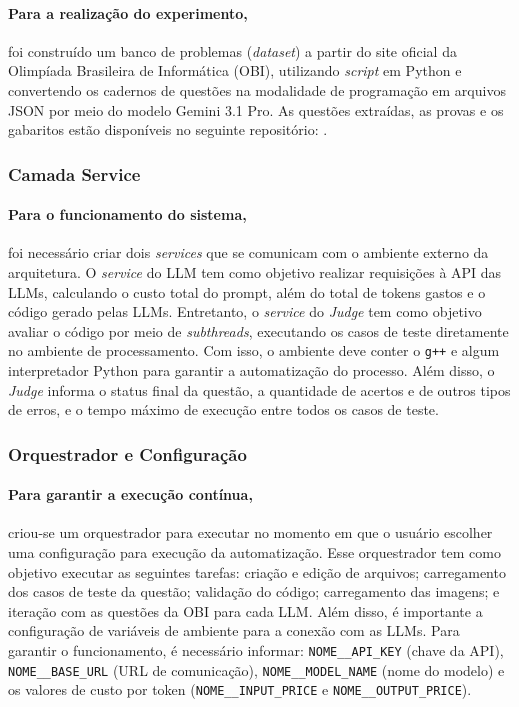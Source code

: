 \documentclass[sigconf]{acmart}
\begin{document}
\paragraph{Para a realização do experimento,}
foi construído um banco de problemas (\textit{dataset}) a partir do site oficial da Olimpíada Brasileira de Informática (OBI), utilizando \textit{script} em Python e convertendo os cadernos de questões na modalidade de programação em arquivos JSON por meio do modelo Gemini 3.1 Pro. As questões extraídas, as provas e os gabaritos estão disponíveis no seguinte repositório: \cite{gema2026problems}.

\subsubsection{Camada Service}
\label{sec:Camada de Service}
\paragraph{Para o funcionamento do sistema,} foi necessário criar dois \textit{services} que se comunicam com o ambiente externo da arquitetura. O \textit{service} do LLM tem como objetivo realizar requisições à API das LLMs, calculando o custo total do prompt, além do total de tokens gastos e o código gerado pelas LLMs. Entretanto, o \textit{service} do \textit{Judge} tem como objetivo avaliar o código por meio de \textit{subthreads}, executando os casos de teste diretamente no ambiente de processamento. Com isso, o ambiente deve conter o \texttt{g++} e algum interpretador Python para garantir a automatização do processo. Além disso, o \textit{Judge} informa o status final da questão, a quantidade de acertos e de outros tipos de erros, e o tempo máximo de execução entre todos os casos de teste.

\subsubsection{Orquestrador e Configuração}
\label{sec:Orquestrador e configuração}
\paragraph{Para garantir a execução contínua,} criou-se um orquestrador para executar no momento em que o usuário escolher uma configuração para execução da automatização. Esse orquestrador tem como objetivo executar as seguintes tarefas: criação e edição de arquivos; carregamento dos casos de teste da questão; validação do código; carregamento das imagens; e iteração com as questões da OBI para cada LLM.
Além disso, é importante a configuração de variáveis de ambiente para a conexão com as LLMs. Para garantir o funcionamento, é necessário informar: \texttt{NOME\_\_API\_KEY} (chave da API), \texttt{NOME\_\_BASE\_URL} (URL de comunicação), \texttt{NOME\_\_MODEL\_NAME} (nome do modelo) e os valores de custo por token (\texttt{NOME\_\_INPUT\_PRICE} e \texttt{NOME\_\_OUTPUT\_PRICE}).
\end{document}
